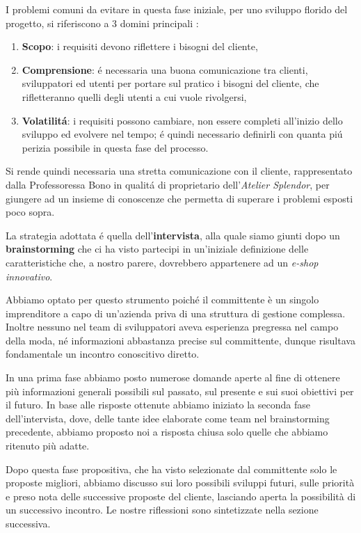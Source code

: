\documentclass[12pt]{article}
\begin{document}
I problemi comuni da evitare in questa fase iniziale, per uno sviluppo florido del progetto, si riferiscono a 3 domini principali \cite{up-riferimento}:
\begin{enumerate}
    \item \textbf{Scopo}: i requisiti devono riflettere i bisogni del cliente,
    \item \textbf{Comprensione}: \'e necessaria una buona comunicazione tra clienti, sviluppatori ed utenti per portare sul pratico i bisogni del cliente, che rifletteranno quelli degli utenti a cui vuole rivolgersi,
    \item \textbf{Volatilit\'a}: i requisiti possono cambiare, non essere completi all'inizio dello sviluppo ed evolvere nel tempo; \'e quindi necessario definirli con quanta pi\'u perizia possibile in questa fase del processo.
\end{enumerate}

Si rende quindi necessaria una stretta comunicazione con il cliente, rappresentato dalla Professoressa Bono in qualit\'a di proprietario dell'{\em Atelier Splendor}, per giungere ad un insieme di conoscenze che permetta di superare i problemi esposti poco sopra.

La strategia adottata \'e quella dell'\textbf{intervista}, alla quale siamo giunti dopo un \textbf{brainstorming} che ci ha visto partecipi in un'iniziale definizione delle caratteristiche che, a nostro parere, dovrebbero appartenere ad un \textit{e-shop innovativo}.

Abbiamo optato per questo strumento poiché il committente è un singolo imprenditore a capo di un'azienda priva di una struttura di gestione complessa.
Inoltre nessuno nel team di sviluppatori aveva esperienza pregressa nel campo della moda, né informazioni abbastanza precise sul committente, dunque risultava fondamentale un incontro conoscitivo diretto.

In una prima fase abbiamo posto numerose domande aperte al fine di ottenere più informazioni generali possibili sul passato, sul presente e sui suoi obiettivi per il futuro.
In base alle risposte ottenute abbiamo iniziato la seconda fase dell'intervista, dove, delle tante idee elaborate come team nel brainstorming precedente, abbiamo proposto noi a risposta chiusa solo quelle che abbiamo ritenuto più adatte.

Dopo questa fase propositiva, che ha visto selezionate dal committente solo le proposte migliori, abbiamo discusso sui loro possibili sviluppi futuri, sulle priorità e preso nota delle successive proposte del cliente, lasciando aperta la possibilità di un successivo incontro.
Le nostre riflessioni sono sintetizzate nella sezione successiva. 
\end{document}
